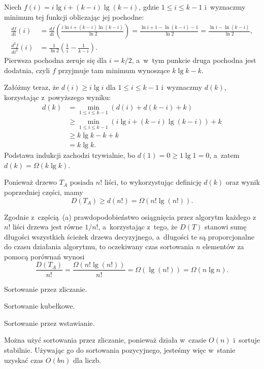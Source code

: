 \subproblem %
Niech $f(i)=i\lg i+(k-i)\lg(k-i)$, gdzie $1\le i\le k-1$ i~wyznaczmy minimum tej funkcji obliczając jej pochodne:
\begin{align*}
	\frac{df}{di}(i) &= \frac{df}{di}\left(\frac{i\ln i+(k-i)\ln(k-i)}{\ln2}\right) = \frac{\ln i+1-\ln(k-i)-1}{\ln2} = \frac{\ln i-\ln(k-i)}{\ln2}, \\[2mm]
	\frac{d^2\!f}{di^2}(i) &= \frac{1}{\ln2}\left(\frac{1}{i}-\frac{1}{k-i}\right).
\end{align*}
Pierwsza pochodna zeruje się dla $i=k/2$, a~w~tym punkcie druga pochodna jest dodatnia, czyli $f$ przyjmuje tam minimum wynoszące $k\lg k-k$.

Załóżmy teraz, że $d(i)\ge i\lg i$ dla $1\le i\le k-1$ i~wyznaczmy $d(k)$, korzystając z~powyższego wyniku:
\begin{align*}
	d(k) &= \min_{1\le i\le k-1}(d(i)+d(k-i)+k) \\
	&\ge \min_{1\le i\le k-1}(i\lg i+(k-i)\lg(k-i))+k \\
	&\ge k\lg k-k+k \\
	&= k\lg k.
\end{align*}
Podstawa indukcji zachodzi trywialnie, bo $d(1)=0\ge 1\lg1=0$, a~zatem $d(k)=\Omega(k\lg k)$.

\subproblem %
Ponieważ drzewo $T_A$ posiada $n!$ liści, to wykorzystując definicję $d(k)$ oraz wynik poprzedniej części, mamy
\[
	D(T_A) \ge d(n!) = \Omega(n!\lg(n!)).
\]

Zgodnie z~częścią~(a) prawdopodobieństwo osiągnięcia przez algorytm każdego z~$n!$ liści drzewa jest równe $1/n!$, a~korzystając z~tego, że $D(T)$ stanowi sumę długości wszystkich ścieżek drzewa decyzyjnego, a~długości te są proporcjonalne do czasu działania algorytmu, to oczekiwany czas sortowania $n$ elementów za pomocą porównań wynosi
\[
	\frac{D(T_A)}{n!} = \frac{\Omega(n!\lg(n!))}{n!} = \Omega(\lg(n!)) = \Omega(n\lg n).
\]

\subproblem %


\subproblem %
Sortowanie przez zliczanie.

\subproblem %
Sortowanie kubełkowe.

\subproblem %
Sortowanie przez wstawianie.

\subproblem %
Można użyć sortowania przez zliczanie, ponieważ działa w~czasie $O(n)$ i~sortuje stabilnie. Używając go do sortowania pozycyjnego, jesteśmy więc w~stanie uzyskać czas $O(bn)$ dla  liczb.

